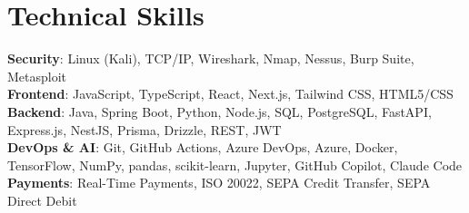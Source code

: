 \documentclass[letterpaper,11.5pt]{article}
\begin{document}
\section{Technical Skills}
 \begin{itemize}[leftmargin=0.15in, label={}, topsep=2pt]
    \small{\item{
     \textbf{Security}{: Linux (Kali), TCP/IP, Wireshark, Nmap, Nessus, Burp Suite, Metasploit} \\ 
     \textbf{Frontend}{: JavaScript, TypeScript, React, Next.js, Tailwind CSS, HTML5/CSS} \\ 
     \textbf{Backend}{: Java, Spring Boot, Python, Node.js, SQL, PostgreSQL, FastAPI, Express.js, NestJS, Prisma, Drizzle, REST, JWT} \\ 
     \textbf{DevOps \& AI}{: Git, GitHub Actions, Azure DevOps, Azure, Docker, TensorFlow, NumPy, pandas, scikit-learn, Jupyter, GitHub Copilot, Claude Code} \\
     \textbf{Payments}{: Real-Time Payments, ISO 20022, SEPA Credit Transfer, SEPA Direct Debit} 
    }}
 \end{itemize}
\end{document}
